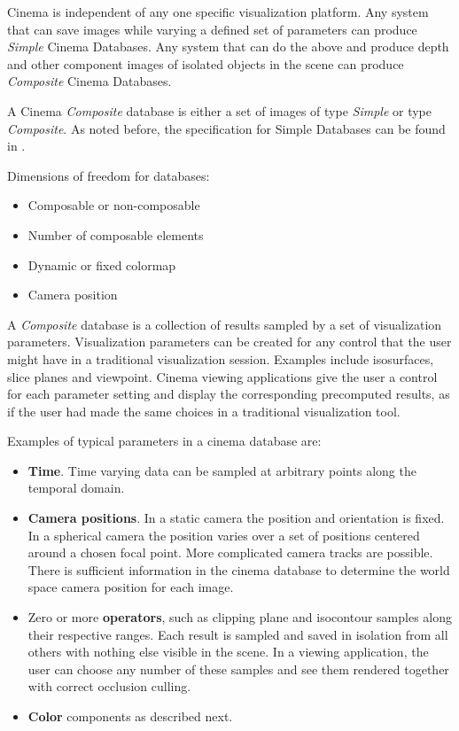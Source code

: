 \documentclass{article}
\newcommand{\Composite} {\textit{Composite}\xspace}
\newcommand{\Simple} {\textit{Simple}\xspace}
\begin{document}
Cinema is independent of any one specific visualization platform. Any system that can save images while varying a defined set of parameters can produce \textit{Simple} Cinema Databases. Any system that can do the above and produce depth and other component images of isolated objects in the scene can produce \Composite Cinema Databases.

A Cinema \Composite database is either a set of images of type \Simple or type \Composite. As noted before, the specification for Simple Databases can be found in \cite{cinemaSimpleFileSpec}.

Dimensions of freedom for databases:

\begin{itemize}
\item Composable or non-composable
\item Number of composable elements
\item Dynamic or fixed colormap
\item Camera position
\end{itemize}

A \Composite database is a collection of results sampled by a set of visualization parameters. Visualization parameters can be created for any control that the user might have in a traditional visualization session. Examples include isosurfaces, slice planes and viewpoint. Cinema viewing applications give the user a control for each parameter setting and display the corresponding precomputed results, as if the user had made the same choices in a traditional visualization tool.

Examples of typical parameters in a cinema database are:
\begin{itemize}
\item \textbf{Time}. Time varying data can be sampled at arbitrary points along the temporal domain.
\item \textbf{Camera positions}. In a static camera the position and orientation is fixed. In a spherical camera the position varies over a set of positions centered around a chosen focal point. More complicated camera tracks are possible. There is sufficient information in the cinema database to determine the world space camera position for each image.
\item Zero or more \textbf{operators}, such as clipping plane and isocontour samples along their respective ranges. Each result is sampled and saved in isolation from all others with nothing else visible in the scene. In a viewing application, the user can choose any number of these samples and see them rendered together with correct occlusion culling.
\item \textbf{Color} components as described next.
\end{itemize}
\end{document}
